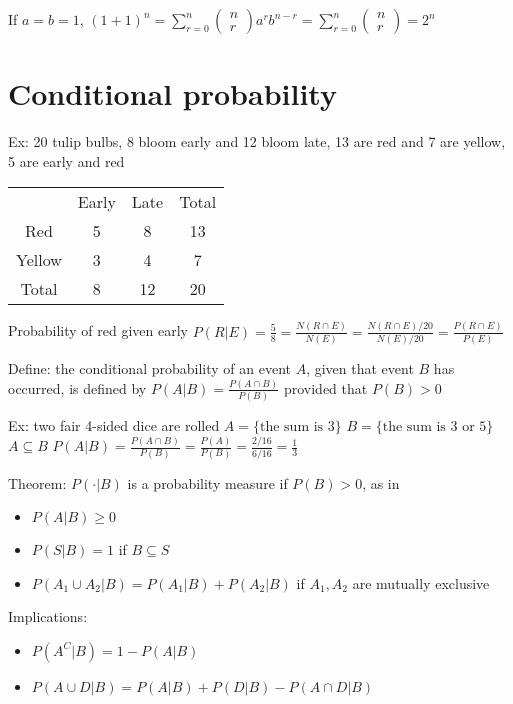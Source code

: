 \documentclass{article}
\begin{document}
If $a=b=1$, $(1+1)^n=\sum_{r=0}^n\begin{pmatrix}
    n\\r
\end{pmatrix}a^rb^{n-r}=\sum_{r=0}^n\begin{pmatrix}
    n\\r
\end{pmatrix}=2^n$

\section{Conditional probability}

Ex: 20 tulip bulbs, 8 bloom early and 12 bloom late, 13 are red and 7 are yellow, 5 are early and red
\begin{table}[]
    \centering
    \begin{tabular}{cccc}
         &   Early& Late&Total\\
         Red& 
     5& 8&13\\
 Yellow& 3& 4&7\\
 Total& 8& 12&20\\\end{tabular}
\end{table}
Probability of red given early $P(R\vert E)=\frac{5}{8}=\frac{N(R\cap E)}{N(E)}=\frac{N(R\cap E)/20}{N(E)/20}=\frac{P(R\cap E)}{P(E)}$

Define: the conditional probability of an event $A$, given that event $B$ has occurred, is defined by $P(A\vert B)=\frac{P(A\cap B)}{P(B)}$ provided that $P(B)>0$

Ex: two fair 4-sided dice are rolled
$A=\{\text{the sum is }3\}$
$B=\{\text{the sum is }3\text{ or }5\}$
$A\subseteq B$
$P(A\vert B)=\frac{P(A\cap B)}{P(B)}=\frac{P(A)}{P(B)}=\frac{2/16}{6/16}=\frac{1}{3}$

Theorem: $P(\cdot\vert B)$ is a probability measure if $P(B)>0$, as in
\begin{itemize}
    \item $P(A\vert B)\ge0$
    \item $P(S\vert B)=1$ if $B\subseteq S$
    \item $P(A_1\cup A_2\vert B)=P(A_1\vert B)+P(A_2\vert B)$ if $A_1,A_2$ are mutually exclusive
\end{itemize}

Implications:
\begin{itemize}
    \item $P(A^C\vert B)=1-P(A\vert B)$
    \item $P(A\cup D\vert B)=P(A\vert B)+P(D\vert B)-P(A\cap D\vert B)$
\end{itemize}
\end{document}
